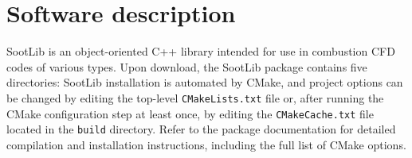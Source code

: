 \documentclass[preprint,letterpaper]{elsarticle}
\begin{document}

\section{Software description}
\label{s:architecture}

SootLib is an object-oriented C++ library intended for use in combustion CFD codes of various types.
Upon download, the SootLib package contains five directories:
SootLib installation is automated by CMake, and project options can be changed by editing the top-level \texttt{CMakeLists.txt} file or, after running the CMake configuration step at least once, by editing the \texttt{CMakeCache.txt} file located in the \texttt{build} directory. Refer to the package documentation for detailed compilation and installation instructions, including the full list of CMake options.
\end{document}
